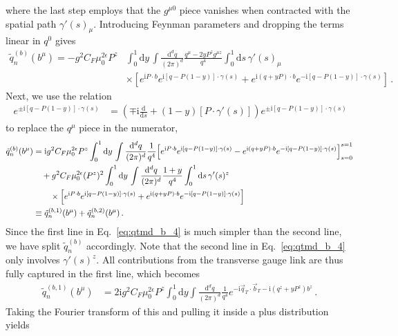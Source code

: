 \documentclass[11pt,a4paper]{article}
\DeclareRobustCommand{\eq}[1]{Eq.~\eqref{eq:#1}}
\newcommand{\df}{\mathrm{d}}
\newcommand{\img}{\mathrm{i}}
\newcommand{\eps}{\epsilon}
\newcommand{\nn}{\nonumber}
\newcommand{\bt}{\vec b_T}
\newcommand{\qt}{\vec q_T}
\begin{document}
where the last step employs that the $g^{\mu0}$ piece vanishes
when contracted with the spatial path $\gamma'(s)_\mu$.
Introducing Feynman parameters and dropping the terms linear in $q^0$ gives
\begin{align} \label{eq:qtmd_b_3}
 \tilde q^{(b)}_n (b^\mu)
= -g^2 C_F \mu_0^{2\eps} P^z
  &\int_0^1 \df y \, \int\frac{\df^d q}{(2\pi)^d}
  \frac{q^\mu -2 y P^z g^{\mu z}}{q^4}
  \int_0^1 \df s \, \gamma'(s)_\mu
  \nn\\&\times
  \left[ e^{\img P \cdot b} e^{\img [q - P(1-y)] \cdot \gamma(s)}
      + e^{\img (q + y P) \cdot b} e^{-\img [q - P(1-y)] \cdot\gamma(s)}\right]
\,.\end{align}
Next, we use the relation
\begin{align}
 [q \cdot \gamma'(s)] \, e^{\pm \img [q - P(1-y)] \cdot \gamma(s)}
 &= \left( \mp \img \frac{\df}{\df s} + (1-y) [P \cdot \gamma'(s)] \right) e^{\pm \img [q - P(1-y)] \cdot \gamma(s)}
\end{align}
to replace the $q^\mu$ piece in the numerator,
\begin{align} \label{eq:qtmd_b_4}
 \tilde q^{(b)}_n (b^\mu) &
 = \img g^2 C_F \mu_0^{2\eps} P^z
  \int_0^1 \df y \, \int\frac{\df^d q}{(2\pi)^d} \frac{1}{q^4}
  \Bigl[e^{\img P \cdot b} e^{\img [q - P(1-y)] \cdot \gamma(s)}
  - e^{\img (q + y P) \cdot b} e^{-\img [q - P(1-y)] \cdot\gamma(s)} \Bigr]_{s=0}^{s=1}
 \nn\\&\quad
  + g^2 C_F \mu_0^{2\eps} (P^z)^2
  \int_0^1 \df y \, \int\frac{\df^d q}{(2\pi)^d}
  \frac{1+y}{q^4} \int_0^1 \df s \, \gamma'(s)^z
  \nn\\&\qquad\times
  \left[ e^{\img P \cdot b} e^{\img [q - P(1-y)] \cdot \gamma(s)}
      + e^{\img (q + y P) \cdot b} e^{-\img [q - P(1-y)] \cdot\gamma(s)}\right]
 \nn\\&
 \equiv \tilde q^{(b,1)}_n (b^\mu) + \tilde q^{(b,2)}_n (b^\mu)
\,.\end{align}
Since the first line in \eq{qtmd_b_4} is much simpler than the second line,
we have split $\tilde q_n^{(b)}$ accordingly.
%
Note that the second line in \eq{qtmd_b_4} only involves $\gamma'(s)^z$.
All contributions from the transverse gauge link are thus
fully captured in the first line, which becomes
\begin{align} \label{eq:qtmd_b1_1}
 \tilde q^{(b,1)}_n (b^\mu) &
 = 2 \img g^2 C_F \mu_0^{2\eps} P^z
  \int_0^1 \df y \int\frac{\df^d q}{(2\pi)^d} \frac{1}{q^4}
  e^{- \img \qt \cdot \bt - \img (q^z + y P^z) b^z}
\,.\end{align}
Taking the Fourier transform of this and pulling it inside a plus distribution yields
\end{document}

